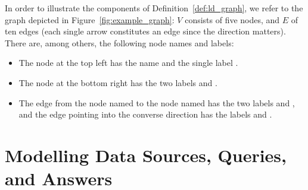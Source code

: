 In order to illustrate the components of Definition~\ref{def:ld_graph},
we refer to the graph depicted in Figure~\ref{fig:example_graph}:
$V$ consists of five nodes, and $E$ of ten edges
(each single arrow constitutes an edge since the direction matters).
There are, among others, the following node names and labels:
%
\begin{itemize}
  \item
    The node at the top left has the name 
    and the single label .
  \item 
    The node at the bottom right has the two labels  and .
  \item 
    The edge from the node named  to the node named 
    has the two labels  and ,
    and the edge pointing into the converse direction has the labels
     and .
\end{itemize}
%


\section{Modelling Data Sources, Queries, and Answers}
\label{sec:modelling}

